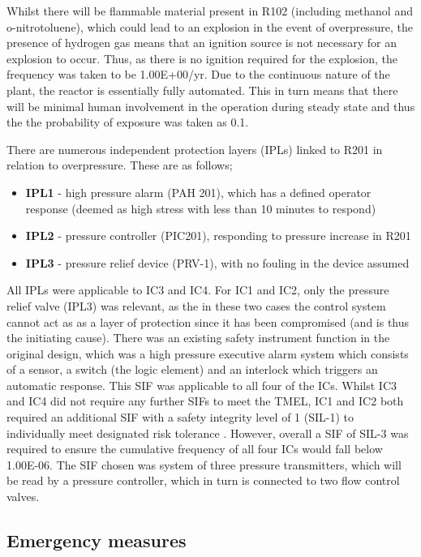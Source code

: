 Whilst there will be flammable material present in R102 (including methanol and o-nitrotoluene), which could lead to an explosion in the event of overpressure, the presence of hydrogen gas means that an ignition source is not necessary for an explosion to occur. Thus, as there is no ignition required for the explosion, the frequency was taken to be 1.00E+00/yr. Due to the continuous nature of the plant, the reactor is essentially fully automated. This in turn means that there will be minimal human involvement in the operation during steady state and thus the the probability of exposure was taken as 0.1. 

There are numerous  independent protection layers (IPLs) linked to R201 in relation to overpressure. These are as follows;
 
 \begin{itemize}
\item \textbf{IPL1} - high pressure alarm (PAH 201), which has a defined operator response (deemed as high stress with less than 10 minutes to respond)
\item  \textbf{IPL2} - pressure controller (PIC201), responding to pressure increase in R201
\item  \textbf{IPL3} - pressure relief device (PRV-1), with no fouling in the device assumed
 \end{itemize}

All IPLs were applicable to IC3 and IC4. For IC1 and IC2, only the pressure relief valve (IPL3) was relevant, as the in these two cases the control system cannot act as as a layer of protection since it has been compromised (and is thus the initiating cause). There was an existing safety instrument function in the original design, which was a high pressure executive alarm system which consists of a sensor, a switch (the logic element) and an interlock which triggers an automatic response. This SIF was applicable to all four of the ICs. Whilst IC3 and IC4 did not require any further SIFs to meet the TMEL, IC1 and IC2 both required an additional SIF with a safety integrity level of 1 (SIL-1) to individually meet designated risk tolerance . However, overall a SIF of SIL-3 was required to ensure the cumulative frequency of all four ICs would fall below 1.00E-06. The SIF chosen was system of three pressure transmitters, which will be read by a pressure controller, which in turn is connected to two flow control valves. 


\subsection{Emergency measures }

